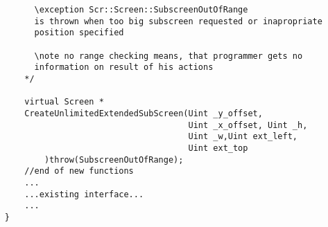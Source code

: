 \documentclass[11pt,a4paper]{article}
\begin{document}
\begin{lstlisting}
		  \exception Scr::Screen::SubscreenOutOfRange
		  is thrown when too big subscreen requested or inapropriate
		  position specified

		  \note no range checking means, that programmer gets no
		  information on result of his actions
		*/

		virtual Screen *
		CreateUnlimitedExtendedSubScreen(Uint _y_offset,
										 Uint _x_offset, Uint _h,
										 Uint _w,Uint ext_left,
										 Uint ext_top
			)throw(SubscreenOutOfRange);
		//end of new functions
		...
		...existing interface...
		...
    } 
\end{lstlisting}
\end{document}
